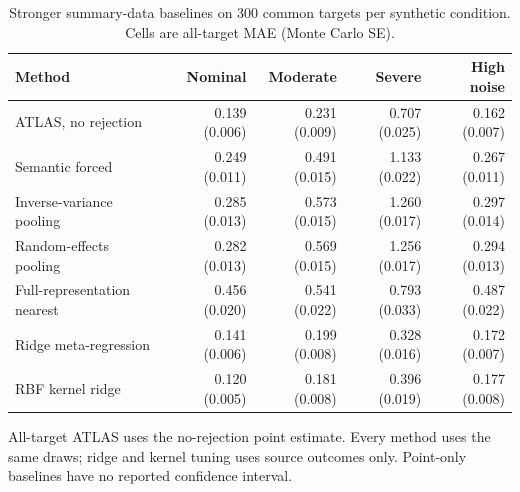 \begin{table}[htbp]
\centering\small
\setlength{\tabcolsep}{4pt}
\caption{Stronger summary-data baselines on 300 common targets per synthetic condition. Cells are all-target MAE (Monte Carlo SE).}
\label{tab:ext-baselines}
\begin{tabular}{lrrrr}
\toprule
Method & Nominal & Moderate & Severe & High noise \\
\midrule
ATLAS, no rejection & 0.139 (0.006) & 0.231 (0.009) & 0.707 (0.025) & 0.162 (0.007) \\
Semantic forced & 0.249 (0.011) & 0.491 (0.015) & 1.133 (0.022) & 0.267 (0.011) \\
Inverse-variance pooling & 0.285 (0.013) & 0.573 (0.015) & 1.260 (0.017) & 0.297 (0.014) \\
Random-effects pooling & 0.282 (0.013) & 0.569 (0.015) & 1.256 (0.017) & 0.294 (0.013) \\
Full-representation nearest & 0.456 (0.020) & 0.541 (0.022) & 0.793 (0.033) & 0.487 (0.022) \\
Ridge meta-regression & 0.141 (0.006) & 0.199 (0.008) & 0.328 (0.016) & 0.172 (0.007) \\
RBF kernel ridge & 0.120 (0.005) & 0.181 (0.008) & 0.396 (0.019) & 0.177 (0.008) \\
\bottomrule
\end{tabular}
\par\smallskip\begin{minipage}{0.97\linewidth}\footnotesize All-target ATLAS uses the no-rejection point estimate. Every method uses the same draws; ridge and kernel tuning uses source outcomes only. Point-only baselines have no reported confidence interval.\end{minipage}
\end{table}
